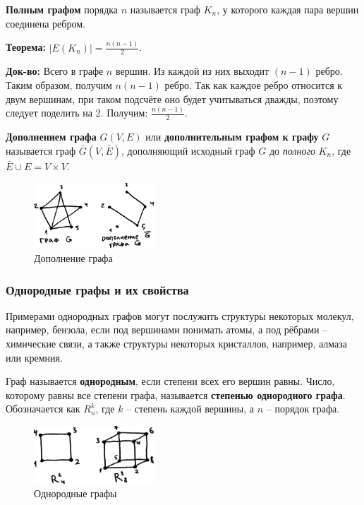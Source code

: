 \documentclass[12pt, a4paper]{article}
\begin{document}
\textbf{Полным графом} порядка $n$ называется граф $K_n$, у которого каждая пара вершин соединена ребром.

\textbf{Теорема:} $|E(K_n)| = \frac{n(n-1)}{2}$.

\textbf{Док-во:} Всего в графе $n$ вершин. Из каждой из них выходит $(n-1)$ ребро. Таким образом, получим $n(n-1)$ ребро. Так как каждое ребро относится к двум вершинам, при таком подсчёте оно будет учитываться дважды, поэтому следует поделить на 2. Получим: $\frac{n(n-1)}{2}$.

\textbf{Дополнением графа} $G(V,E)$ или \textbf{дополнительным графом к графу} $G$ называется граф $\bar{G}(V,\bar{E})$, дополняющий исходный граф $G$ до \textit{полного} $K_n$, где $\bar{E} \cup E = V \times V$.

\begin{figure}[h]
 \centering
 \includegraphics[width=0.4\textwidth]{31}
 \vspace{-4mm}
  \caption{Дополнение графа}
\end{figure}


\subsubsection{Однородные графы и их свойства}

Примерами однородных графов могут послужить структуры некоторых молекул, например, бензола, если под вершинами понимать атомы, а под рёбрами -- химические связи, а также структуры некоторых кристаллов, например, алмаза или кремния.

Граф называется \textbf{однородным}, если степени всех его вершин равны. Число, которому равны все степени графа, называется \textbf{степенью однородного графа}. Обозначается как $R_n^k$, где $k$ -- степень каждой вершины, а $n$ -- порядок графа.

\begin{figure}[h]
 \centering
 \includegraphics[width=0.4\textwidth]{32}
 \vspace{-3mm}
  \caption{Однородные графы}
\end{figure}
\end{document}
